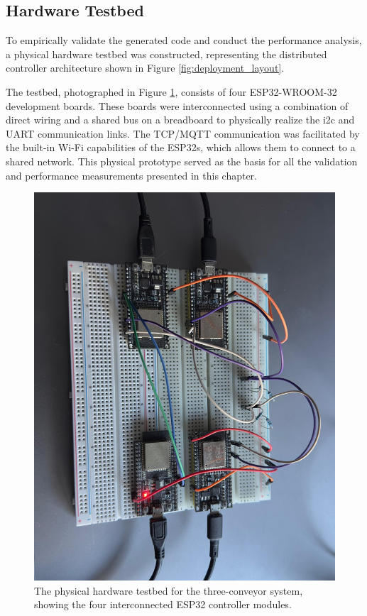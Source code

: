 \subsection{Hardware Testbed}
\label{subsec:hardware_setup}

To empirically validate the generated code and conduct the performance analysis, a physical hardware testbed was constructed, representing the distributed controller architecture shown in Figure \ref{fig:deployment_layout}. 

The testbed, photographed in Figure \ref{fig:hardware_photo}, consists of four ESP32-WROOM-32 development boards. These boards were interconnected using a combination of direct wiring and a shared bus on a breadboard to physically realize the \gls{i2c} and UART communication links. The TCP/MQTT communication was facilitated by the built-in Wi-Fi capabilities of the ESP32s, which allows them to connect to a shared network. This physical prototype served as the basis for all the validation and performance measurements presented in this chapter.

\begin{figure}[htb!]
    \centering
    \includegraphics[width=0.9\columnwidth]{Chapters/Figures/photo_of_setup.jpeg}
    \caption{The physical hardware testbed for the three-conveyor system, showing the four interconnected ESP32 controller modules.}
    \label{fig:hardware_photo}
\end{figure}


